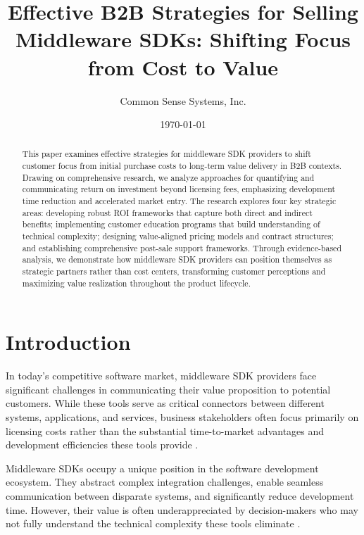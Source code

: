 \documentclass[11pt,a4paper]{article}
\title{\LARGE\textbf{Effective B2B Strategies for Selling Middleware SDKs: Shifting Focus from Cost to Value}}
\author{Common Sense Systems, Inc.}
\date{\today}
\begin{document}
\maketitle
\thispagestyle{fancy}

\begin{abstract}
This paper examines effective strategies for middleware SDK providers to shift customer focus from initial purchase costs to long-term value delivery in B2B contexts. Drawing on comprehensive research, we analyze approaches for quantifying and communicating return on investment beyond licensing fees, emphasizing development time reduction and accelerated market entry. The research explores four key strategic areas: developing robust ROI frameworks that capture both direct and indirect benefits; implementing customer education programs that build understanding of technical complexity; designing value-aligned pricing models and contract structures; and establishing comprehensive post-sale support frameworks. Through evidence-based analysis, we demonstrate how middleware SDK providers can position themselves as strategic partners rather than cost centers, transforming customer perceptions and maximizing value realization throughout the product lifecycle.
\end{abstract}

\tableofcontents
\newpage

\section{Introduction}

In today's competitive software market, middleware SDK providers face significant challenges in communicating their value proposition to potential customers. While these tools serve as critical connectors between different systems, applications, and services, business stakeholders often focus primarily on licensing costs rather than the substantial time-to-market advantages and development efficiencies these tools provide \cite{tradecentric2023}.

Middleware SDKs occupy a unique position in the software development ecosystem. They abstract complex integration challenges, enable seamless communication between disparate systems, and significantly reduce development time. However, their value is often underappreciated by decision-makers who may not fully understand the technical complexity these tools eliminate \cite{ibm2023}.
\end{document}
